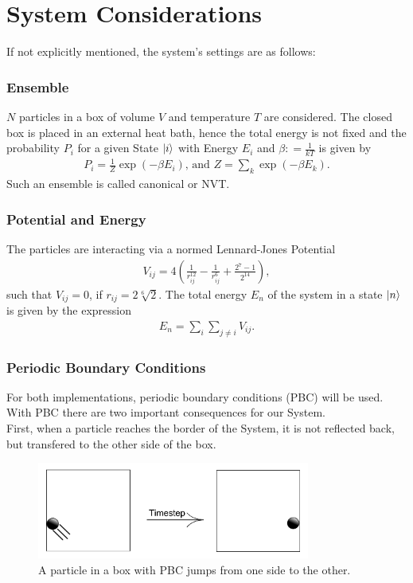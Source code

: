\section{System Considerations}
If not explicitly mentioned, the system's settings are as follows:
\subsubsection*{Ensemble}
$N$ particles in a box of volume $V$ and temperature $T$ are considered.
The closed box is placed in an external heat bath, hence the total energy is not fixed and the probability $P_i$ for a given State $\ket{i}$ with Energy $E_i$ and $\beta \mathrel{\mathop:}= \frac{1}{kT}$ is given by
\begin{align}
	P_i = \frac{1}{Z}\exp\left(-\beta E_i\right)\text{, and }
	Z = \sum_k \exp\left(-\beta E_k\right).
\end{align}
Such an ensemble is called canonical or NVT.

\subsubsection*{Potential and Energy}
The particles are interacting via a normed Lennard-Jones Potential
\begin{align}
\label{LJPot}
	V_{ij} = 4\left(\frac{1}{r_{ij}^{12}} - \frac{1}{r_{ij}^6} + \frac{2^7 - 1}{2^{14}}\right),
\end{align}
such that $V_{ij}=0$, if $r_{ij} = 2\sqrt[6]2$.
The total energy $E_n$ of the system in a state $\ket{n}$ is given by the expression
\begin{align}
	E_n = \sum_i\sum_{j\neq i}V_{ij}.
\end{align}
\newpage
\subsubsection*{Periodic Boundary Conditions}
For both implementations, periodic boundary conditions (PBC) will be used.
With PBC there are two important consequences for our System. \\

First, when a particle reaches the border of the System, it is not reflected back, but transfered to the other side of the box.

\begin{figure}[h!]
\centering
\includegraphics[width=0.8\textwidth]{PBCjump.pdf}
\caption{A particle in a box with PBC jumps from one side to the other.}
\end{figure}

